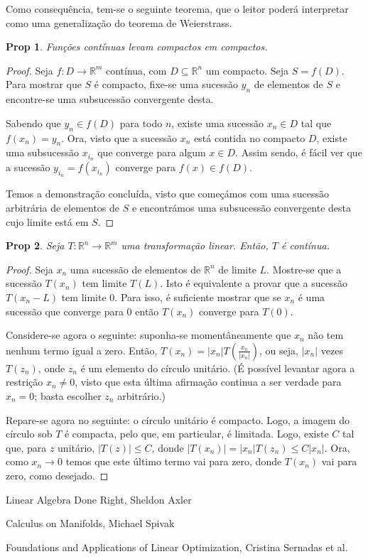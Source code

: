 \documentclass{article}
\newcommand{\R}{\mathbb{R}}
\newtheorem{prop}{Prop}
\theoremstyle{definition}
\begin{document}
	Como consequência, tem-se o seguinte teorema, que o leitor poderá interpretar como uma generalização do teorema de Weierstrass.
	
	\begin{prop}
	Funções contínuas levam compactos em compactos.
	\end{prop}
	
	\begin{proof}
	Seja $f : D \to \R^m$ contínua, com $D \subseteq \R^n$ um compacto. Seja $S = f(D)$. Para mostrar que $S$ é compacto, fixe-se uma sucessão $y_n$ de elementos de $S$ e encontre-se uma subsucessão convergente desta.
	
	Sabendo que $y_n \in f(D)$ para todo $n$, existe uma sucessão $x_n \in D$ tal que $f(x_n) = y_n$. Ora, visto que a sucessão $x_n$ está contida no compacto $D$, existe uma subsucessão $x_{i_n}$ que converge para algum $x \in D$. Assim sendo, é fácil ver que a sucessão $y_{i_n} = f(x_{i_n})$ converge para $f(x) \in f(D)$.
	
	Temos a demonstração concluída, visto que começámos com uma sucessão arbitrária de elementos de $S$ e encontrámos uma subsucessão convergente desta cujo limite está em $S$.
	\end{proof}
	
	\begin{prop}
	Seja $T : \R^n \to \R^m$ uma transformação linear. Então, $T$ é contínua.
	\end{prop}
	
	\begin{proof}
	Seja $x_n$ uma sucessão de elementos de $\R^n$ de limite $L$. Mostre-se que a sucessão $T(x_n)$ tem limite $T(L)$. Isto é equivalente a provar que a sucessão $T(x_n - L)$ tem limite $0$. Para isso, é suficiente mostrar que se $x_n$ é uma sucessão que converge para $0$ então $T(x_n)$ converge para $T(0)$.
	
	Considere-se agora o seguinte: suponha-se momentâneamente que $x_n$ não tem nenhum termo igual a zero. Então, $T(x_n) = \lvert x_n \rvert T(\frac{x_n}{\lvert x_n \rvert})$, ou seja, $\lvert x_n \rvert$ vezes $T(z_n)$, onde $z_n$ é um elemento do círculo unitário. (É possível levantar agora a restrição $x_n \neq 0$, visto que esta última afirmação continua a ser verdade para $x_n = 0$; basta escolher $z_n$ arbitrário.)
	
	Repare-se agora no seguinte: o círculo unitário é compacto. Logo, a imagem do círculo sob $T$ é compacta, pelo que, em particular, é limitada. Logo, existe $C$ tal que, para $z$ unitário, $\lvert T(z) \rvert \leq C$, donde $\lvert T(x_n) \rvert = \lvert x_n \rvert T(z_n) \leq C \lvert x_n \rvert$. Ora, como $x_n \rightarrow 0$ temos que este último termo vai para zero, donde $T(x_n)$ vai para zero, como desejado. 
	\end{proof}
	
	\begin{thebibliography}{9}
	 Linear Algebra Done Right, Sheldon Axler
	
	 Calculus on Manifolds, Michael Spivak
	
	 Foundations and Applications of Linear Optimization, Cristina Sernadas et al.
	\end{thebibliography}
	
\end{document}
